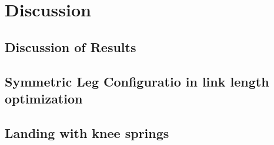 \section{Discussion}

\subsection{Discussion of Results}

\subsection{Symmetric Leg Configuratio in link length optimization}

\subsection{Landing with knee springs}
